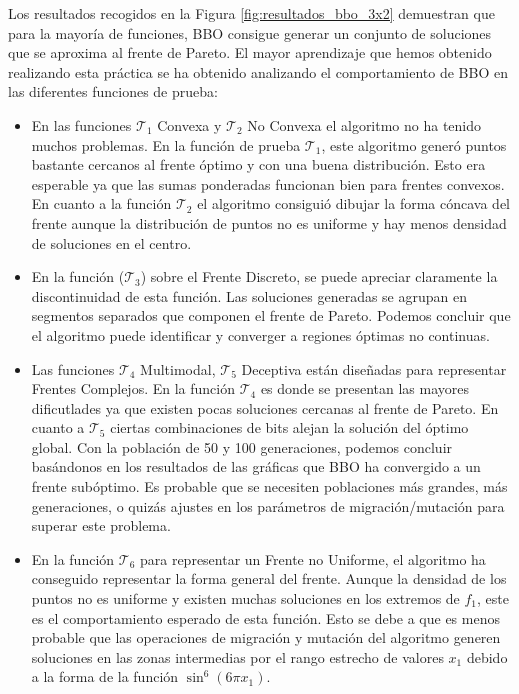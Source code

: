 Los resultados recogidos en la Figura \ref{fig:resultados_bbo_3x2} demuestran que para la mayoría de funciones, BBO consigue generar un conjunto de soluciones que se aproxima al frente de Pareto. El mayor aprendizaje que hemos obtenido realizando esta práctica se ha obtenido analizando el comportamiento de BBO en las diferentes funciones de prueba: \\
\begin{itemize}
    \item En las funciones $\mathcal{T}_1$ Convexa y $\mathcal{T}_2$ No Convexa el algoritmo no ha tenido muchos problemas. En la función de prueba $\mathcal{T}_1$, este algoritmo generó puntos bastante cercanos al frente óptimo y con una buena distribución. Esto era esperable ya que las sumas ponderadas funcionan bien para frentes convexos. En cuanto a la función $\mathcal{T}_2$ el algoritmo consiguió dibujar la forma cóncava del frente aunque la distribución de puntos no es uniforme y hay menos densidad de soluciones en el centro.
    \item En la función ($\mathcal{T}_3$) sobre el Frente Discreto, se puede apreciar claramente la discontinuidad de esta función. Las soluciones generadas se agrupan en segmentos separados que componen el frente de Pareto. Podemos concluir que el algoritmo puede identificar y converger a regiones óptimas no continuas.
    \item Las funciones $\mathcal{T}_4$ Multimodal, $\mathcal{T}_5$ Deceptiva están diseñadas para representar Frentes Complejos. En la función $\mathcal{T}_4$ es donde se presentan las mayores dificutlades ya que existen pocas soluciones cercanas al frente de Pareto. En cuanto a $\mathcal{T}_5$ ciertas combinaciones de bits alejan la solución del óptimo global. Con la población de 50 y 100 generaciones, podemos concluir basándonos en los resultados de las gráficas que BBO ha convergido a un frente subóptimo. Es probable que se necesiten poblaciones más grandes, más generaciones, o quizás ajustes en los parámetros de migración/mutación para superar este problema.
    \item En la función $\mathcal{T}_6$ para representar un Frente no Uniforme, el algoritmo ha conseguido representar la forma general del frente. Aunque la densidad de los puntos no es uniforme y existen muchas soluciones en los extremos de $f_1$, este es el comportamiento esperado de esta función. Esto se debe a que es menos probable que las operaciones de migración y mutación del algoritmo generen soluciones en las zonas intermedias por el rango estrecho de valores $x_1$ debido a la forma de la función $\sin^6(6\pi x_1)$.
\end{itemize}

